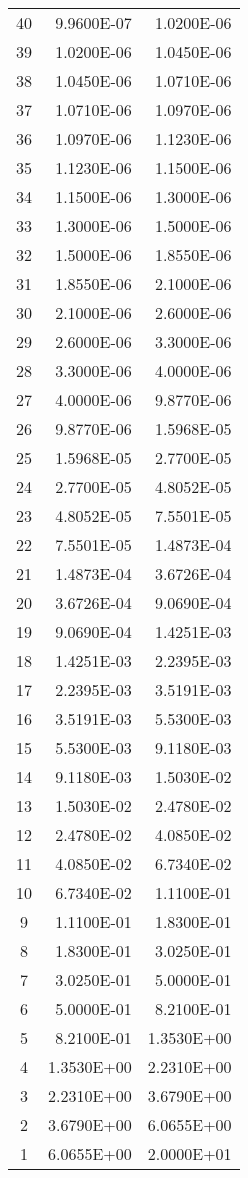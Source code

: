 \begin{appendices}
{\begin{longtable}[h!]{c r r}
		40 & 9.9600E-07 & 1.0200E-06 \\
		39 & 1.0200E-06 & 1.0450E-06 \\
		38 & 1.0450E-06 & 1.0710E-06 \\
		37 & 1.0710E-06 & 1.0970E-06 \\
		36 & 1.0970E-06 & 1.1230E-06 \\
		35 & 1.1230E-06 & 1.1500E-06 \\
		34 & 1.1500E-06 & 1.3000E-06 \\
		33 & 1.3000E-06 & 1.5000E-06 \\
		32 & 1.5000E-06 & 1.8550E-06 \\
		31 & 1.8550E-06 & 2.1000E-06 \\
		30 & 2.1000E-06 & 2.6000E-06 \\
		29 & 2.6000E-06 & 3.3000E-06 \\
		28 & 3.3000E-06 & 4.0000E-06 \\
		27 & 4.0000E-06 & 9.8770E-06 \\
		26 & 9.8770E-06 & 1.5968E-05 \\
		25 & 1.5968E-05 & 2.7700E-05 \\
		24 & 2.7700E-05 & 4.8052E-05 \\
		23 & 4.8052E-05 & 7.5501E-05 \\
		22 & 7.5501E-05 & 1.4873E-04 \\
		21 & 1.4873E-04 & 3.6726E-04 \\
		20 & 3.6726E-04 & 9.0690E-04 \\
		19 & 9.0690E-04 & 1.4251E-03 \\
		18 & 1.4251E-03 & 2.2395E-03 \\
		17 & 2.2395E-03 & 3.5191E-03 \\
		16 & 3.5191E-03 & 5.5300E-03 \\
		15 & 5.5300E-03 & 9.1180E-03 \\
		14 & 9.1180E-03 & 1.5030E-02 \\
		13 & 1.5030E-02 & 2.4780E-02 \\
		12 & 2.4780E-02 & 4.0850E-02 \\
		11 & 4.0850E-02 & 6.7340E-02 \\
		10 & 6.7340E-02 & 1.1100E-01 \\
		9 & 1.1100E-01 & 1.8300E-01 \\
		8 & 1.8300E-01 & 3.0250E-01 \\
		7 & 3.0250E-01 & 5.0000E-01 \\
		6 & 5.0000E-01 & 8.2100E-01 \\
		5 & 8.2100E-01 & 1.3530E+00 \\
		4 & 1.3530E+00 & 2.2310E+00 \\
		3 & 2.2310E+00 & 3.6790E+00 \\
		2 & 3.6790E+00 & 6.0655E+00 \\
		1 & 6.0655E+00 & 2.0000E+01 \\
		\bottomrule
	\end{longtable}
}

\end{appendices}
